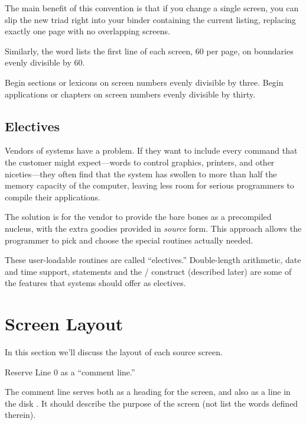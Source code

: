 The main benefit of this convention is that if you change a single
screen, you can slip the new triad right into your binder containing
the current listing, replacing exactly one page with no overlapping
screens.

Similarly, the word  lists the first line of each screen,
60 per page, on boundaries evenly divisible by 60.

%
\begin{tip}
Begin sections or lexicons on screen numbers evenly divisible by three.
Begin applications or chapters on screen numbers evenly divisible by
thirty.
\end{tip}%

\subsection{Electives}%
Vendors of \Forth{} systems have a problem.  If they want to include
every command that the customer might expect---words to control
graphics, printers, and other niceties---they often find that the system
has swollen to more than half the memory capacity of the computer,
leaving less room for serious programmers to compile their
applications.

The solution is for the vendor to provide the bare bones as a
precompiled nucleus, with the extra goodies provided in \emph{source} form.
This approach allows the programmer to pick and choose the special
routines actually needed.

These user-loadable routines are called ``electives.'' Double-length
arithmetic, date and time support,  statements and the
/\hy {} construct (described later) are some of
the features that \Forth{} systems should offer as electives.%
%

\section{Screen Layout}%
%

In this section we'll discuss the layout of each source screen.

%
\begin{tip}
Reserve Line 0 as a ``comment line.''
\end{tip}
The comment line serves both as a heading for the screen, and also as
a line in the disk .  It should describe the purpose of
the screen (not list the words defined therein).

